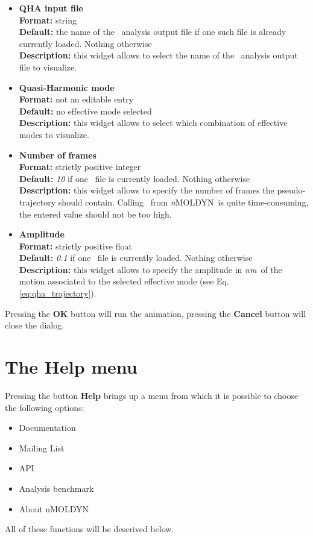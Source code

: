 \documentclass[a4paper,11pt]{report}
\newcommand{\nm}{\textit{nm}}
\newcommand{\NMOLDYN}{\textit{n}MOLDYN}
\begin{document}
\begin{itemize}
\item \textbf{QHA input file}\\
\textbf{Format:} string\\
\textbf{Default:} the name of the \QHA\ analysis output file if one such file is already currently loaded. Nothing otherwise\\
\textbf{Description:} this widget allows to select the name of the \QHA\ analysis output file to visualize.

\item \textbf{Quasi-Harmonic mode}\\
\textbf{Format:} not an editable entry\\
\textbf{Default:} no effective mode selected\\
\textbf{Description:} this widget allows to select which combination of effective modes to visualize.

\item \textbf{Number of frames}\\
\textbf{Format:} strictly positive integer\\
\textbf{Default:} \textit{10} if one \QHA\ file is currently loaded. Nothing otherwise\\
\textbf{Description:} this widget allows to specify the number of frames the pseudo-trajectory should contain.
Calling \VMD\ from \NMOLDYN\ is quite time-consuming, the entered value should not be too high.

\item \textbf{Amplitude}\\
\textbf{Format:} strictly positive float\\
\textbf{Default:} \textit{0.1} if one \QHA\ file is currently loaded. Nothing otherwise\\
\textbf{Description:} this widget allows to specify the amplitude in \nm\ of the motion associated to the selected 
effective mode (see Eq. \ref{eq:qha_trajectory}).
\end{itemize}
Pressing the \textbf{OK} button will run the animation, pressing the \textbf{Cancel} button will close the dialog.

\section{The \textbf{Help} menu}
\label{help_menu}
Pressing the button \textbf{Help} brings up a menu from which it is possible to choose the following options:
\begin{itemize}
\item Documentation
\item Mailing List
\item API
\item Analysis benchmark
\item About nMOLDYN
\end{itemize}
All of these functions will be descrived below.
\end{document}
